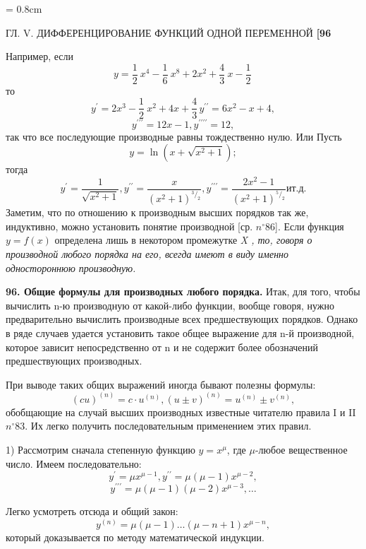 \documentclass[a5paper]{book}
\begin{document}
\parindent = 0.8cm

\begin{center}
\hspace{30pt}
{\scriptsize\centering\textsection ГЛ. V. ДИФФЕРЕНЦИРОВАНИЕ ФУНКЦИЙ ОДНОЙ ПЕРЕМЕННОЙ}
\hspace{15pt}
\textbf{[96}\\

\end{center}
	
\smallskip
	
Например, если 
$$
y=\frac{1}{2}\ x^4-\frac{1}{6}\ x^8+2x^2+\frac{4}{3}\ x-\frac{1}{2}\,
$$
\noindent то
$$
y^{\prime}=2x^3-\frac{1}{2}\ x^2+4x+\frac{4}{3}\, y^{\prime\prime}=6x^2-x+4,
$$
$$
y^{\prime\prime\prime}=12x-1, y^{\prime\prime\prime\prime}=12,
$$
\noindent так что все последующие производные равны тождественно нулю. Или Пусть
$$
y=\ln (x+\sqrt{x^2+1});
$$
\noindent тогда
$$
y^\prime=\dfrac{1}{\sqrt{x^2+1}}, y^{\prime\prime}=\dfrac{x}{(x^2+1)^{^3/_2}}, y^{\prime\prime\prime}=\dfrac{2x^2-1}{(x^2+1)^{^5/_2}} и т.д.
$$
Заметим, что по отношению к производным высших порядков так же, индуктивно, можно установить понятие  производной [ср. $n^{\circ}86$]. Если функция $y=f(x)$ определена лишь в некотором промежутке \slshape X \upshape, то, говоря о производной любого порядка на  его, всегда имеют в виду именно одностороннюю производную.

\smallskip
	
\textbf{96. Общие формулы для производных любого порядка.} Итак, для того, чтобы вычислить n-ю производную от какой-либо функции, вообще говоря, нужно предварительно вычислить производные всех предшествующих порядков. Однако в ряде случаев удается установить такое общее выражение для n-й производной, которое зависит непосредственно от n и не содержит более обозначений предшествующих производных.

При выводе таких общих выражений иногда бывают полезны формулы:
$$
(cu)^{(n)}=c\cdot u^{(n)}, (u\pm v)^{(n)}=u^{(n)}\pm v^{(n)},
$$
обобщающие на случай высших производных известные читателю правила I и II $n^{\circ}83$. Их легко получить последовательным применением этих правил.

1) Рассмотрим сначала степенную функцию $y=x^{\mu}$, где $\mu$-любое вещественное число. Имеем последовательно:
$$
y^\prime =\mu x^{\mu-1}, y^{\prime\prime}=\mu(\mu-1)x^{\mu-2},
$$
$$
y^{\prime\prime\prime}=\mu(\mu-1)(\mu-2)x^{\mu-3},\ldots
$$

\noindent Легко усмотреть отсюда и общий закон:
$$
y^{(n)}=\mu(\mu-1)\ldots(\mu-n+1)x^{\mu-n},
$$
\noindent который доказывается по методу математической индукции.
\end{document}

